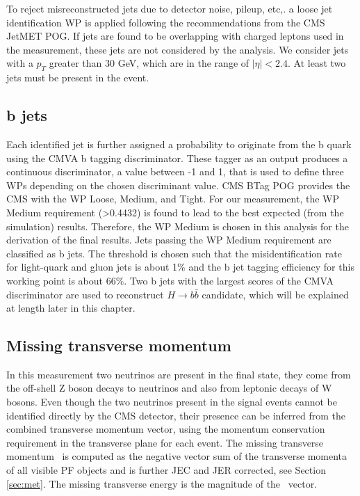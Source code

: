 To reject misreconstructed jets due to detector noise, pileup, etc,. a loose jet identification WP is applied following the recommendations from the CMS JetMET POG. If jets are found to be overlapping with charged leptons used in the measurement, these jets are not considered by the analysis. We consider jets with a $p_T$ greater than 30 GeV, which are in the range of $|\eta| < 2.4$. At least two jets must be present in the event. 

\subsection{b jets}\label{sec:bjets}
Each identified jet is further assigned a probability to originate from the b quark using the CMVA b tagging discriminator. These tagger as an output produces a continuous discriminator, a value between -1 and 1, that is used to define three WPs depending on the chosen discriminant value. CMS BTag POG provides the CMS with the WP Loose, Medium, and Tight. For our measurement, the WP Medium requirement (>0.4432) is found to lead to the best expected (from the simulation) results. Therefore, the WP Medium is chosen in this analysis for the derivation of the final results. Jets passing the WP Medium requirement are classified as b jets. The threshold is chosen such that the misidentification rate for light-quark and gluon jets is about 1$\%$ and the b jet tagging efficiency for this working point is about 66$\%$. Two b jets with the largest scores of the CMVA discriminator are used to reconstruct $H \to b\bar{b}$ candidate, which will be explained at length later in this chapter.  

\subsection{Missing transverse momentum}
In this measurement two neutrinos are present in the final state, they come from the off-shell Z boson decays to neutrinos and also from leptonic decays of W bosons. Even though the two neutrinos present in the signal events cannot be identified directly by the CMS detector, their presence can be inferred from the combined transverse momentum vector, using the momentum conservation requirement in the transverse plane for each event.  The missing transverse momentum ~\PTslash is computed as the negative vector sum of the transverse momenta of all visible PF objects and is further JEC and JER corrected, see Section \ref{sec:met}. The missing transverse energy \ETslash is the magnitude of the ~\PTslash vector. 


